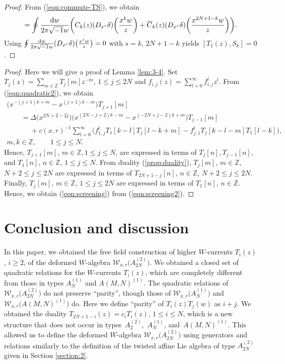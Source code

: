 \documentclass[10pt,a4paper]{amsart}
\numberwithin{equation}{section}
\begin{document}
\begin{proof}
From (\ref{eqn:commute-TS}), we obtain
\begin{gather*}
[T_1(z), S_k]=\oint \frac{{\rm d}w}{2\pi \sqrt{-1}w}
\bigg(C_k(z)(D_{x^{r}}\delta)\bigg(\frac{x^{k}w}{z}\bigg)+\overline{C}_k(z)
(D_{x^{r}}\delta)\bigg(\frac{x^{2N+1-k}w}{z}\bigg)\bigg).
\end{gather*}
Using
$\oint \frac{{\rm d}w}{2\pi \sqrt{-1}w}
(D_{x^{r}}\delta)\big(\frac{x^{s}w}{z}\big)=0$ with $s=k$, $2N+1-k$
yields $[T_1(z), S_k]=0$.
\end{proof}

\begin{proof}
Here we will give a proof of Lemma \ref{lem:3-4}.
Set $T_j(z)=\sum_{m \in \mathbb{Z}}T_j[m]z^{-m}$,
$1\leq j \leq 2N$ and $f_{i,j}(z)=\sum_{l=0}^\infty f_{i,j}^lz^l$.
From (\ref{eqn:quadratic2}), we obtain
\begin{gather*}
\big(x^{-(j+1)k+m}-x^{(j+1)k-m}\big)T_{j+1}[m]
\\ \qquad
{}=\Delta\big(x^{2N+2-2j}\big)\big(x^{(2N-j+2)k-m}-x^{(-2N+j-2)k+m}\big)T_{j-1}[m]
\\ \qquad\phantom{=}
{}+c(x,r)^{-1}\sum_{l=0}^\infty
\big(f_{1,j}^l T_1[k-l]T_j[l-k+m]-f_{j,1}^l
T_j[k-l-m]T_1[l-k]\big),
\\
m, k\in \mathbb{Z},\qquad
1\leq j \leq N.
\end{gather*}
Hence, $T_{j+1}[m]$, $m \in \mathbb{Z}, 1\leq j \leq N$,
are expressed in terms of $T_{j}[n], T_{j-1}[n]$,
and $T_{1}[n]$, $n \in \mathbb{Z}$, $1\leq j \leq N$.
From duality (\ref{prop:duality}),
$T_j[m]$, $m \in \mathbb{Z}$, $N+2 \leq j \leq 2N$
are expressed in terms of $T_{2N+1-j}[n]$, $n \in \mathbb{Z}$,
$N+2\leq j \leq 2N$.
Finally, $T_{j}[m]$, $m \in \mathbb{Z}$, $1\leq j \leq 2N$
are expressed in terms of $T_1[n]$, $n \in \mathbb{Z}$.
Hence, we obtain (\ref{eqn:screening}) from (\ref{eqn:screening2}).
\end{proof}


\section{Conclusion and discussion}
\label{section:5}

In this paper, we obtained the free field construction of
higher $W$-currents $T_i(z)$, $i \geq 2$,
of the deformed $W$-algebra ${\mathcal W}_{x,r}\big(A_{2N}^{(2)}\big)$.
We obtained a closed set of quadratic relations for the $W$-currents $T_i(z)$,
which are completely different from those in types $A_N^{(1)}$ and $A(M,N)^{(1)}$.
The quadratic relations of ${\mathcal W}_{x,r}\big(A_{2N}^{(2)}\big)$
do not preserve ``parity'', though those of ${\mathcal W}_{x,r}\big(A_N^{(1)}\big)$
and ${\mathcal W}_{x,r}\big(A(M,N)^{(1)}\big)$ do. Here we define
``parity'' of $T_i(z)T_j(w)$ as $i+j$.
We obtained the duality $T_{2N+1-i}(z)=c_i T_{i}(z)$, $1 \leq i \leq N$, which
is a new structure that does not occur in
types~$A_2^{(2)}$,~$A_N^{(1)}$, and~$A(M,N)^{(1)}$.
This allowed us to define the deformed $W$-algebra
${\mathcal W}_{x,r}\big(A_{2N}^{(2)}\big)$ using generators and relations
similarly to the definition of the twisted affine {Lie} algebra
of type $A_{2N}^{(2)}$ given in Section \ref{section:2}.
\end{document}
